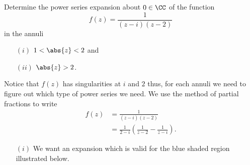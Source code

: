 \documentclass[12pt, a4paper]{article}
\begin{document}
\begin{example}
    Determine the power series expansion about \(0 \in \CC\) of the function
    \[f(z) = \frac{1}{(z-i)(z-2)}\]
    in the annuli 
    \begin{enumerate}
        \item[\((i)\)] \(1<\abs{z}<2\) and 
        \item[\((ii)\)] \(\abs{z}>2\).
    \end{enumerate}
    \begin{solution}
        Notice that \(f(z)\) has singularities at \(i\) and \(2\) thus, for each annuli we need to figure out which type of power series we need. We use the method of partial fractions to write 
        \[\begin{aligned}
            f(z) &= \frac{1}{(z-i)(z-2)} \\
            &= \frac{1}{2-i} \left( \frac{1}{z-2} -\frac{1}{z-i} \right).
        \end{aligned}\]
        \begin{enumerate}
            \item[\((i)\)] We want an expansion which is valid for the blue shaded region illustrated below.
            \begin{figure}[H]
                \begin{center}
\end{center}
\end{figure}
\end{enumerate}
\end{solution}
\end{example}
\end{document}
